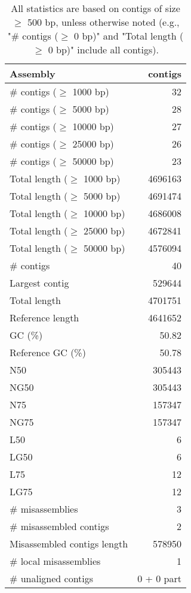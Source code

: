 \documentclass[12pt,a4paper]{article}
\begin{document}
\begin{table}[ht]
\begin{center}
\caption{All statistics are based on contigs of size $\geq$ 500 bp, unless otherwise noted (e.g., "\# contigs ($\geq$ 0 bp)" and "Total length ($\geq$ 0 bp)" include all contigs).}
\begin{tabular}{|l*{1}{|r}|}
\hline
Assembly & contigs \\ \hline
\# contigs ($\geq$ 1000 bp) & 32 \\ \hline
\# contigs ($\geq$ 5000 bp) & 28 \\ \hline
\# contigs ($\geq$ 10000 bp) & 27 \\ \hline
\# contigs ($\geq$ 25000 bp) & 26 \\ \hline
\# contigs ($\geq$ 50000 bp) & 23 \\ \hline
Total length ($\geq$ 1000 bp) & 4696163 \\ \hline
Total length ($\geq$ 5000 bp) & 4691474 \\ \hline
Total length ($\geq$ 10000 bp) & 4686008 \\ \hline
Total length ($\geq$ 25000 bp) & 4672841 \\ \hline
Total length ($\geq$ 50000 bp) & 4576094 \\ \hline
\# contigs & 40 \\ \hline
Largest contig & 529644 \\ \hline
Total length & 4701751 \\ \hline
Reference length & 4641652 \\ \hline
GC (\%) & 50.82 \\ \hline
Reference GC (\%) & 50.78 \\ \hline
N50 & 305443 \\ \hline
NG50 & 305443 \\ \hline
N75 & 157347 \\ \hline
NG75 & 157347 \\ \hline
L50 & 6 \\ \hline
LG50 & 6 \\ \hline
L75 & 12 \\ \hline
LG75 & 12 \\ \hline
\# misassemblies & 3 \\ \hline
\# misassembled contigs & 2 \\ \hline
Misassembled contigs length & 578950 \\ \hline
\# local misassemblies & 1 \\ \hline
\# unaligned contigs & 0 + 0 part \\ \hline

\end{tabular}
\end{center}
\end{table}
\end{document}
